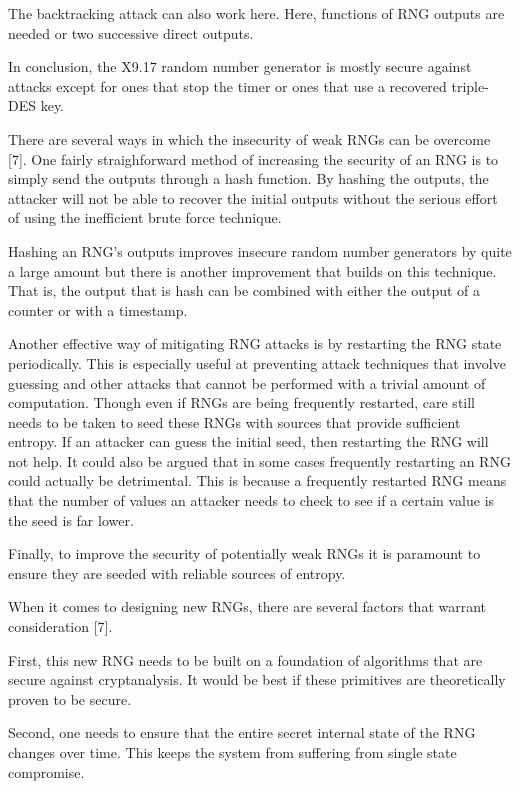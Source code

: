\documentclass{article}
\begin{document}
    The backtracking attack can also work here. Here, functions of RNG outputs
    are needed or two successive direct outputs.

    In conclusion, the X9.17 random number generator is mostly secure against
    attacks except for ones that stop the timer or ones that use a recovered triple-DES
    key.


    There are several ways in which the insecurity of weak RNGs can be overcome [7].
    One fairly straighforward method of increasing the security of an RNG
    is to simply send the outputs through a hash function. By hashing the outputs,
    the attacker will not be able to recover the initial outputs without the
    serious effort of using the inefficient brute force technique.

    Hashing an RNG's outputs improves insecure random number generators by quite
    a large amount but there is another improvement that builds on this technique.
    That is, the output that is hash can be combined with either the output
    of a counter or with a timestamp.

    Another effective way of mitigating RNG attacks is by restarting
    the RNG state periodically. This is especially useful at preventing
    attack techniques that involve guessing and other attacks that cannot
    be performed with a trivial amount of computation.
    Though even if RNGs are being frequently restarted, care still needs
    to be taken to seed these RNGs with sources that provide sufficient
    entropy. If an attacker can guess the initial seed, then restarting
    the RNG will not help.
    It could also be argued that in some cases frequently restarting
    an RNG could actually be detrimental.
    This is because a frequently restarted RNG means that the number
    of values an attacker needs to check to see if a certain value
    is the seed is far lower.

    Finally, to improve the security of potentially weak RNGs it is paramount
    to ensure they are seeded with reliable sources of entropy.

    When it comes to designing new RNGs, there are several factors
    that warrant consideration [7].

    First, this new RNG needs to be built on a foundation
    of algorithms that are secure against cryptanalysis.
    It would be best if these primitives are theoretically proven to be secure.

    Second, one needs to ensure that the entire secret internal state of the RNG
    changes over time.
    This keeps the system from suffering from single state compromise.
\end{document}
